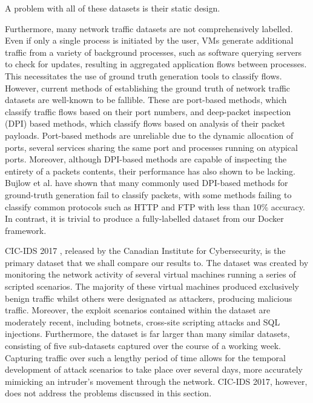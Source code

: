\documentclass[sigconf,anonymous]{acmart}\usepackage[]{graphicx}\usepackage[]{color}
\begin{document}
A problem with all of these datasets is their static design. 



Furthermore, many network traffic datasets are not comprehensively labelled. Even if only a single process is initiated by the user, VMs generate additional traffic from a variety of background processes, such as software querying servers to check for updates, resulting in aggregated application flows between processes. This necessitates the use of ground truth generation tools to classify flows. However, current methods of establishing the ground truth of network traffic datasets are well-known to be fallible\cite{carela2014our}. These are port-based methods, which classify traffic flows based on their port numbers, and deep-packet inspection (DPI) based methods, which classify flows based on analysis of their packet payloads. Port-based methods are unreliable due to the dynamic allocation of ports, several services sharing the same port and processes running on atypical ports. Moreover, although DPI-based methods are capable of inspecting the entirety of a packets contents, their performance has also shown to be lacking. Bujlow et al. \cite{bujlow2013comparison} have shown that many commonly used DPI-based methods for ground-truth generation fail to classify packets, with some methods failing to classify common protocols such as HTTP and FTP with less than 10\% accuracy. In contrast, it is trivial to produce a fully-labelled dataset from our Docker framework.

CIC-IDS 2017 \cite{sharafaldin2018toward}, released by the Canadian Institute for Cybersecurity, is the primary dataset that we shall compare our results to. The dataset was created by monitoring the network activity of several virtual machines running a series of scripted scenarios. The majority of these virtual machines produced exclusively benign traffic whilst others were designated as attackers, producing malicious traffic. Moreover, the exploit scenarios contained within the dataset are moderately recent, including botnets, cross-site scripting attacks and SQL injections. Furthermore, the dataset is far larger than many similar datasets, consisting of five sub-datasets captured over the course of a working week. Capturing traffic over such a lengthy period of time allows for the temporal development of attack scenarios to take place over several days, more accurately mimicking an intruder's movement through the network. CIC-IDS 2017, however, does not address the problems discussed in this section.
\end{document}
